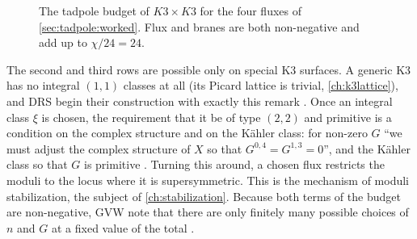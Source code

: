 \begin{figure}[t]
\centering
{}
\caption{The tadpole budget of $K3\times K3$ for the four fluxes of
\cref{sec:tadpole:worked}. Flux and branes are both non-negative and add up to $\chi/24=24$.}
\label{fig:tadpole:budget}
\end{figure}

\begin{physicsbox}
The second and third rows are possible only on special K3 surfaces. A generic K3 has no
integral $(1,1)$ classes at all (its Picard lattice is trivial, \cref{ch:k3lattice}), and DRS
begin their construction with exactly this remark . Once an
integral class $\xi$ is chosen, the requirement that it be of type $(2,2)$ and primitive
is a condition on the complex structure and on the K\"ahler class: for non-zero $G$ ``we
must adjust the complex structure of $X$ so that $G^{0,4}=G^{1,3}=0$'', and the K\"ahler
class so that $G$ is primitive .
Turning this around, a chosen flux restricts the moduli to
the locus where it is supersymmetric. This is the mechanism of moduli stabilization, the
subject of \cref{ch:stabilization}. Because both terms of the budget are non-negative, GVW note that there are only finitely many
possible choices of $n$ and $G$ at a fixed value of the total .
\end{physicsbox}

